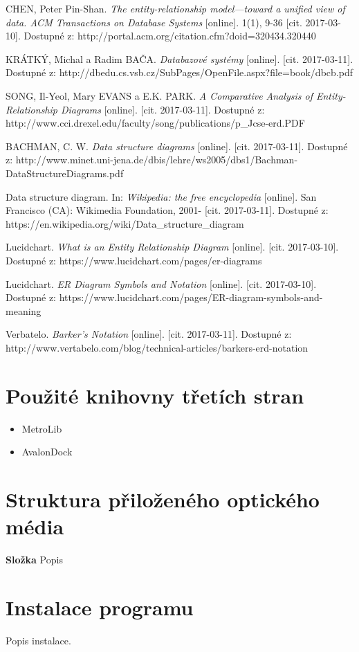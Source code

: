 \documentclass[czech,bachelor,public,dept460,male,oneside]{diploma}
\begin{document}
\begin{thebibliography}{99}
	 CHEN, Peter Pin-Shan. \textit{The entity-relationship model---toward a unified view of data. ACM Transactions on Database Systems} [online]. 1(1), 9-36 [cit. 2017-03-10]. Dostupné z: http://portal.acm.org/citation.cfm?doid=320434.320440
	
	 KRÁTKÝ, Michal a Radim BAČA. \textit{Databazové systémy} [online]. [cit. 2017-03-11]. Dostupné z: http://dbedu.cs.vsb.cz/SubPages/OpenFile.aspx?file=book/dbcb.pdf
	
	 SONG, Il-Yeol, Mary EVANS a E.K. PARK. \textit{A Comparative Analysis of Entity-Relationship Diagrams} [online]. [cit. 2017-03-11]. Dostupné z: http://www.cci.drexel.edu/faculty/song/publications/p{\_}Jcse-erd.PDF
	
	 BACHMAN, C. W. \textit{Data structure diagrams} [online]. [cit. 2017-03-11]. Dostupné z: http://www.minet.uni-jena.de/dbis/lehre/ws2005/dbs1/Bachman-DataStructureDiagrams.pdf
	
	 Data structure diagram. In: \textit{Wikipedia: the free encyclopedia} [online]. San Francisco (CA): Wikimedia Foundation, 2001- [cit. 2017-03-11]. Dostupné z: https://en.wikipedia.org/wiki/Data{\_}structure{\_}diagram
	
	
	Lucidchart. \textit{What is an Entity Relationship Diagram} [online]. [cit. 2017-03-10]. Dostupné z: https://www.lucidchart.com/pages/er-diagrams
	
	Lucidchart. \textit{ER Diagram Symbols and Notation} [online]. [cit. 2017-03-10]. Dostupné z: https://www.lucidchart.com/pages/ER-diagram-symbols-and-meaning
	
	 Verbatelo. \textit{Barker’s Notation} [online]. [cit. 2017-03-11]. Dostupné z: http://www.vertabelo.com/blog/technical-articles/barkers-erd-notation
	
\end{thebibliography}


\appendix
\section{Použité knihovny třetích stran}
\begin{itemize}
	\item MetroLib
	\item AvalonDock
\end{itemize}

\section{Struktura přiloženého optického média}
\textbf{Složka} Popis

\section{Instalace programu}
Popis instalace.
\end{document}
